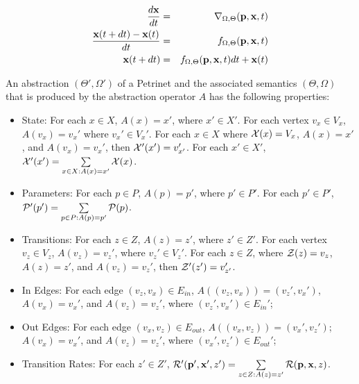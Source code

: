 \begin{eqnarray*}
    \frac{d {\bf x}}{dt} &=& \nabla_{\Omega, \Theta}({\bf p},{\bf x}, t)\\
    \frac{{\bf x}(t+dt)-{\bf x}(t)}{dt} &=& f_{\Omega, \Theta}({\bf p},{\bf x},
    t)\\
    {\bf x}(t+dt)&=& f_{\Omega, \Theta}({\bf p},{\bf x}, t)dt+ {\bf x}(t)
\end{eqnarray*}

\begin{definition}
    An abstraction $(\Theta', \Omega')$ of a Petrinet and the associated
    semantics $(\Theta, \Omega)$ that is produced by the abstraction operator
    $A$ has the following properties:
    \begin{itemize}
        \item State: For each $x \in X$,  $A(x) = x'$, where $x' \in
        X'$.  For each vertex $v_x \in V_x$,  $A(v_x) = v_x'$ where $v_x' \in
        V_x'$.   For each $x\in X$ where  ${\cal X}(x) =
        V_x$, $A(x) = x'$, and $A(v_x) = v_x'$, then ${\cal X}'(x')=
        v_{x'}'$.  For each $x' \in X'$, ${\cal X}'(x') = \sum\limits_{x \in X: A(x) = x'} {\cal X}(x)$.
        \item Parameters: For each $p \in P$, $A(p) = p'$, where $p'\in P'$.
        For each $p' \in P'$, ${\cal P}'(p') = \sum\limits_{p \in P: A(p) = p'} {\cal P}(p)$.
        \item Transitions: For each $z \in Z$, $A(z) = z'$, where $z' \in Z'$.
        For each vertex $v_z \in V_z$, $A(v_z) = v_z'$, where $v_z' \in V_z'$.
        For each $z \in Z$, where ${\cal
        Z}(z) = v_z$, $A(z) = z'$, and $A(v_z) = v_z'$, then ${\cal
        Z}'(z') = v_{z'}'$. 
        \item In Edges: For each edge $(v_z, v_x) \in E_{in}$, $A((v_z, v_x)) =
        (v_z', v_x')$, $A(v_x) = v_x'$, and $A(v_z) = v_z'$, where $(v_z',
        v_x')\in E_{in}'$;
        \item Out Edges: For each edge $(v_x, v_z) \in E_{out}$, $A((v_x, v_z))
        = (v_x', v_z')$; $A(v_x) = v_x'$, and $A(v_z) = v_z'$, where $(v_x',
        v_z')\in E_{out}'$;

        
        \item Transition Rates: For each $z' \in Z'$, ${\cal R}'({\bf p}', {\bf
        x}', z') = \sum\limits_{z \in Z: A(z)=z'} {\cal R}({\bf p}, {\bf
        x}, z)$.
    \end{itemize}
\end{definition}


